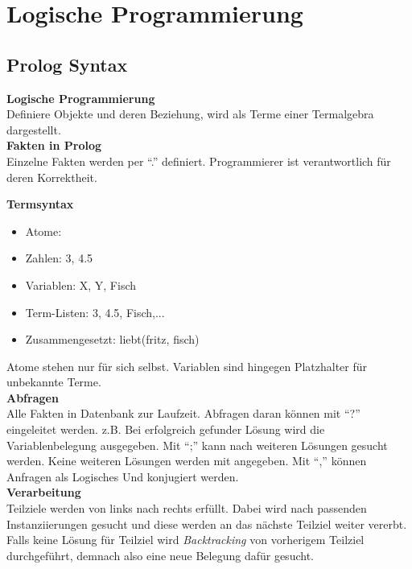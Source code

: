 

\lstset{language=Prolog,mathescape=true}

\section{Logische Programmierung}%
\label{lp:sec:logische-programmierung}

\subsection{Prolog Syntax}%
\label{lp:sub:prolog-syntax}
\textbf{Logische Programmierung}\\
Definiere Objekte und deren Beziehung, wird als Terme einer Termalgebra dargestellt.\\

\textbf{Fakten in Prolog}\\
Einzelne Fakten werden per \enquote{.} definiert.
Programmierer ist verantwortlich für deren Korrektheit.

\textbf{Termsyntax}
\begin{itemize}
  \item Atome: 
  \item Zahlen: 3, 4.5
  \item Variablen: X, Y, Fisch
  \item Term-Listen: 3, 4.5, Fisch,...
  \item Zusammengesetzt: liebt(fritz, fisch)
\end{itemize}
Atome stehen nur für sich selbst. Variablen sind hingegen Platzhalter für unbekannte Terme.\\

\textbf{Abfragen}\\
Alle Fakten in Datenbank zur Laufzeit. Abfragen daran können mit \enquote{?} eingeleitet werden.
z.B. 
Bei erfolgreich gefunder Lösung wird die Variablenbelegung ausgegeben. Mit \enquote{;} kann nach weiteren Lösungen
gesucht werden. Keine weiteren Lösungen werden mit  angegeben.
Mit \enquote{,} können Anfragen als Logisches Und konjugiert werden.\\

\textbf{Verarbeitung}\\
Teilziele werden von links nach rechts erfüllt. Dabei wird nach passenden Instanziierungen gesucht und diese werden
an das nächste Teilziel weiter vererbt. Falls keine Lösung für Teilziel wird \textit{Backtracking} von vorherigem Teilziel
durchgeführt, demnach also eine neue Belegung dafür gesucht.\\

